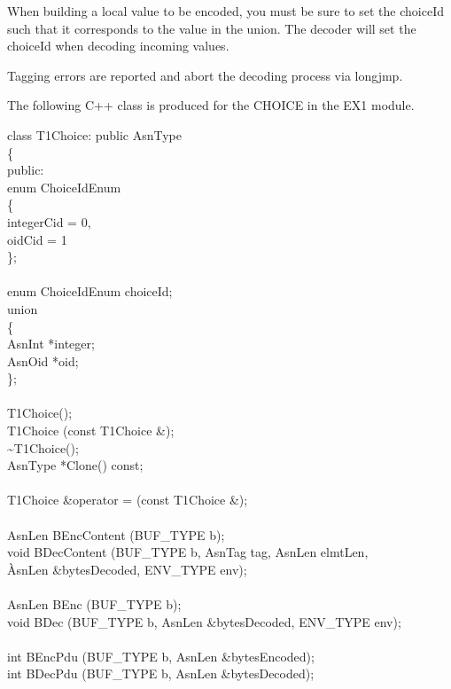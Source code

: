 When building a local value to be encoded, you must be sure to set the
{\C choiceId} such that it corresponds to the value in the union.  The
decoder will set the {\C choiceId} when decoding incoming values.

Tagging errors are reported and abort the decoding process via
{\C longjmp}.

The following C++ class is produced for the CHOICE in the EX1 module.

\begin{Ccode}
class T1Choice: public AsnType\\
\{\\
public:\+\\
  enum ChoiceIdEnum\\
  \{\+\\
    integerCid = 0,\\
    oidCid = 1\-\\
  \};\\
\\
  enum ChoiceIdEnum \>\>choiceId;\\
  union\\
  \{\+\\
    AsnInt   \>*integer;\\
    AsnOid   \>*oid;\-\\
  \};\\
\\
             \>\>T1Choice();\\
	     \>\>T1Choice (const T1Choice \&);\\
	     \>\>\~{}T1Choice();\\
  AsnType    \>\>*Clone() const;\\
\\
  T1Choice   \>\>\&operator = (const T1Choice \&);\\
\\
  AsnLen     \>\>BEncContent (BUF\_TYPE b);\\
  void       \>\>BDecContent (BUF\_TYPE b, AsnTag tag, AsnLen elmtLen,\\
                          \`AsnLen \&bytesDecoded, ENV\_TYPE env);\\
\\
  AsnLen     \>\>BEnc (BUF\_TYPE b);\\
  void       \>\>BDec (BUF\_TYPE b, AsnLen \&bytesDecoded, ENV\_TYPE env);\\
\\
  int        \>\>BEncPdu (BUF\_TYPE b, AsnLen \&bytesEncoded);\\
  int        \>\>BDecPdu (BUF\_TYPE b, AsnLen \&bytesDecoded);\\

\end{Ccode}
